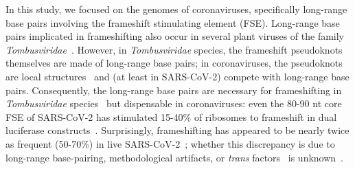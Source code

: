 \documentclass[main.tex]{subfiles}
\begin{document}
In this study, we focused on the genomes of coronaviruses, specifically long-range base pairs involving the frameshift stimulating element (FSE).
Long-range base pairs implicated in frameshifting also occur in several plant viruses of the family \textit{Tombusviridae}~\cite{Barry2002,Tajima2011,Mikkelsen2023}.
However, in \textit{Tombusviridae} species, the frameshift pseudoknots themselves are made of long-range base pairs; in coronaviruses, the pseudoknots are local structures~\cite{Brierley1989,Herald1993,Plant2005b,KZhang2021} and (at least in SARS-CoV-2) compete with long-range base pairs.
Consequently, the long-range base pairs are necessary for frameshifting in \textit{Tombusviridae} species~\cite{Barry2002,Tajima2011,Mikkelsen2023} but dispensable in coronaviruses: even the 80-90 nt core FSE of SARS-CoV-2 has stimulated 15-40\% of ribosomes to frameshift in dual luciferase constructs~\cite{Kelly2020,Haniff2020,KZhang2021,Bhatt2021,YSun2021,Lan2022}.
Surprisingly, frameshifting has appeared to be nearly twice as frequent (50-70\%) in live SARS-CoV-2~\cite{Finkel2021a,Kim2021,PurayChavez2022}; whether this discrepancy is due to long-range base-pairing, methodological artifacts, or \textit{trans} factors~\cite{Riegger2022} is unknown~\cite{Allan2023}.
\end{document}
